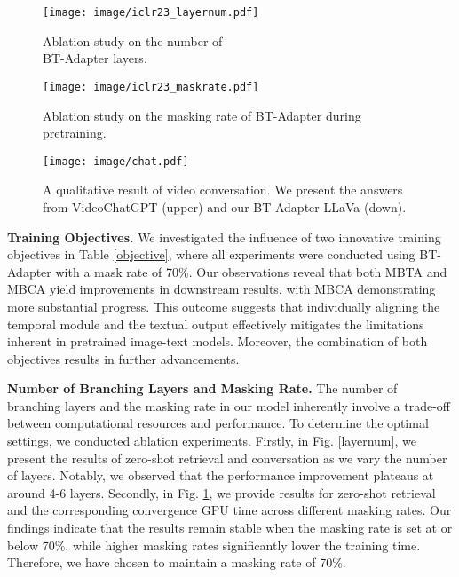 \documentclass{article} \usepackage{iclr2024_conference,times}
\begin{document}
\begin{figure}[htbp] 
    \centering
    \begin{minipage}{0.48\textwidth}
\centering
      \texttt{[image: image/iclr23\_layernum.pdf]} 
\vspace{-1.7em}
      \caption{Ablation study on the number of \\ BT-Adapter layers.}
      \label{layernum}
    \end{minipage}
    \hfill
    \begin{minipage}{0.48\textwidth}
\centering
      \texttt{[image: image/iclr23\_maskrate.pdf]} 
\vspace{-1.6em}
      \caption{Ablation study on the masking rate of BT-Adapter during pretraining.}
      \label{maskrate}
    \end{minipage}
    \vspace{-1.5em}
\end{figure}

\begin{figure*}[t] 
\centering
    \texttt{[image: image/chat.pdf]} 
    \vspace{-1.5em}
    \caption{A qualitative result of video conversation. We present the answers from VideoChatGPT \citep{maaz2023video} (upper) and our BT-Adapter-LLaVa (down).}
    \label{visualize1}
    \vspace{-0.2em}
\end{figure*}

\textbf{Training Objectives.}
We investigated the influence of two innovative training objectives in Table \ref{objective}, where all experiments were conducted using BT-Adapter with a mask rate of 70\%. Our observations reveal that both MBTA and MBCA yield improvements in downstream results, with MBCA demonstrating more substantial progress. This outcome suggests that individually aligning the temporal module and the textual output effectively mitigates the limitations inherent in pretrained image-text models. Moreover, the combination of both objectives results in further advancements.

\textbf{Number of Branching Layers and Masking Rate.} 
The number of branching layers and the masking rate in our model inherently involve a trade-off between computational resources and performance. To determine the optimal settings, we conducted ablation experiments. Firstly, in Fig. \ref{layernum}, we present the results of zero-shot retrieval and conversation as we vary the number of layers. Notably, we observed that the performance improvement plateaus at around 4-6 layers. Secondly, in Fig. \ref{maskrate}, we provide results for zero-shot retrieval and the corresponding convergence GPU time across different masking rates. Our findings indicate that the results remain stable when the masking rate is set at or below 70\%, while higher masking rates significantly lower the training time. Therefore, we have chosen to maintain a masking rate of 70\%.
\end{document}
